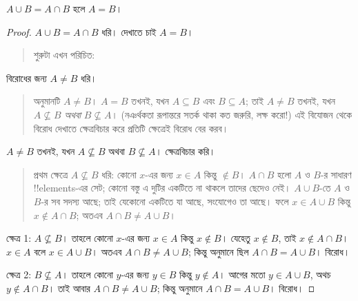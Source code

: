 \documentclass[../../../include/open-logic-section]{subfiles}
\begin{document}
\begin{prop}
$A \cup B = A \cap B$ হলে $A = B$।
\end{prop}

\begin{proof}
  $A \cup B = A \cap B$ ধরি। দেখাতে চাই
  $A = B$।
  \begin{quote}
    শুরুটা এখন পরিচিত:
  \end{quote}
  বিরোধের জন্য $A \neq B$ ধরি।
  \begin{quote}
    অনুমানটি $A \neq B$। $A = B$ তখনই,
    যখন $A \subseteq B$ এবং $B \subseteq A$;
    তাই $A \neq B$ তখনই, যখন
    $A \nsubseteq B$ \emph{অথবা}
    $B \nsubseteq A$। (নঞর্থকতা রূপান্তরে
    সতর্ক থাকা কত জরুরি, লক্ষ করো!{})
    এই বিযোজন থেকে বিরোধ দেখাতে ক্ষেত্রবিচার
    করে প্রতিটি ক্ষেত্রেই বিরোধ বের করব।
  \end{quote}
  $A \neq B$ তখনই, যখন $A \nsubseteq B$
  অথবা $B \nsubseteq A$। ক্ষেত্রবিচার করি।
  \begin{quote}
    প্রথম ক্ষেত্রে $A \nsubseteq B$ ধরি:
    কোনো $x$-এর জন্য $x \in A$ কিন্তু
    $\notin B$। $A \cap B$ হলো $A$ ও $B$-র
    সাধারণ !!{element}s-এর সেট; কোনো বস্তু
    এ দুটির একটিতে না থাকলে তাদের ছেদেও নেই।
    $A \cup B$-তে $A$ ও $B$-র সব সদস্য আছে;
    তাই যেকোনো একটিতে যা আছে, সংযোগেও তা
    আছে। ফলে $x \in A \cup B$ কিন্তু
    $x \notin A \cap B$; অতএব
    $A \cap B \neq A \cup B$।
  \end{quote}

  ক্ষেত্র 1: $A \nsubseteq B$। তাহলে কোনো
  $x$-এর জন্য $x \in A$ কিন্তু $x \notin B$।
  যেহেতু $x \notin B$, তাই $x \notin A \cap B$।
  $x \in A$ বলে $x \in A \cup B$। অতএব
  $A \cap B \neq A \cup B$; কিন্তু অনুমানে
  ছিল $A \cap B = A \cup B$। বিরোধ।

  ক্ষেত্র 2: $B \nsubseteq A$। তাহলে কোনো
  $y$-এর জন্য $y \in B$ কিন্তু $y \notin A$।
  আগের মতো $y \in A \cup B$, অথচ
  $y \notin A \cap B$। তাই আবার
  $A \cap B \neq A \cup B$; কিন্তু অনুমানে
  $A \cap B = A \cup B$। বিরোধ।
\end{proof}
\end{document}
